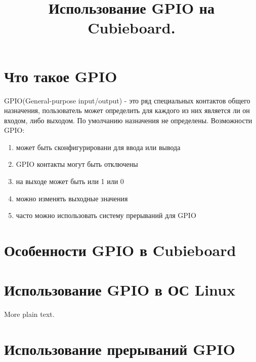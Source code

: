 \documentclass{article}
\title{Использование GPIO на Cubieboard.}
\date{}
\author{}
\begin{document}
\maketitle


\section{Что такое GPIO}

GPIO(General-purpose input/output) - это ряд специальных контактов общего
назначения, пользователь может определить для каждого из них является ли он
входом, либо выходом. 
\newline
По умолчанию назначения не определены.
\newline
Возможности GPIO:\cite{wiki:gpio}
\begin{enumerate}
  \item{может быть сконфигурировани для ввода или вывода}
  \item{GPIO контакты могут быть отключены}
  \item{на выходе может быть или 1 или 0}
  \item{можно изменять выходные значения}
  \item{часто можно использовать систему прерываний для GPIO} 
\end{enumerate}


 
\section{Особенности GPIO в Cubieboard}


\section{Использование GPIO в ОС Linux}

More plain text.

\section{Использование прерываний GPIO}



\end{document}
